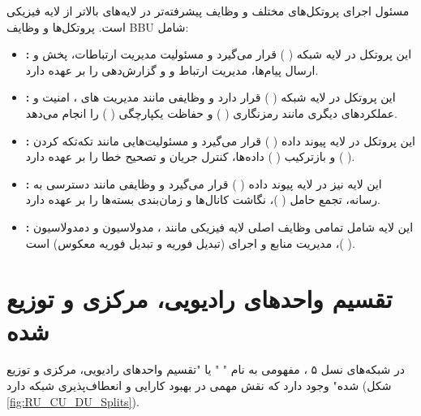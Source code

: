 \documentclass[landscape, 12pt]{report}
\begin{document}
     
        مسئول اجرای پروتکل‌های مختلف و وظایف پیشرفته‌تر در لایه‌های بالاتر از لایه فیزیکی است. پروتکل‌ها و وظایف BBU شامل:
\begin{itemize}
\item
\textbf{
:}
این پروتکل در لایه شبکه (
) قرار می‌گیرد و مسئولیت مدیریت ارتباطات، پخش و ارسال پیام‌ها، مدیریت ارتباط و 
 و گزارش‌دهی را بر عهده دارد.
\item
 \textbf{
 :}
 این پروتکل در لایه شبکه (
 ) قرار دارد و وظایفی مانند مدیریت
   های
     ، امنیت و عملکردهای دیگری مانند رمزنگاری (
     ) و حفاظت یکپارچگی (
     ) را انجام می‌دهد.
\item
\textbf{
:}
این پروتکل در لایه پیوند داده (
) قرار می‌گیرد و مسئولیت‌هایی مانند تکه‌تکه کردن (
) و بازترکیب  (
) داده‌ها، کنترل جریان و تصحیح خطا را بر عهده دارد.
\item
\textbf{
:}
 این لایه نیز در لایه پیوند داده (
 ) قرار می‌گیرد و وظایفی مانند دسترسی به رسانه، تجمع حامل (
 )، نگاشت کانال‌ها
   و زمان‌بندی بسته‌ها را بر عهده دارد.
\item
\textbf{
:}
این لایه شامل تمامی وظایف اصلی لایه فیزیکی مانند 
، مدولاسیون و دمدولاسیون (
 )، مدیریت منابع و اجرای
  (تبدیل فوریه و تبدیل فوریه معکوس) است.
\end{itemize}

      
\chapter*{تقسیم واحدهای رادیویی، مرکزی و توزیع شده}   
در شبکه‌های نسل ۵ ، مفهومی به نام "
" یا "تقسیم واحدهای رادیویی، مرکزی و توزیع شده" وجود دارد که نقش مهمی در بهبود کارایی و انعطاف‌پذیری شبکه دارد (شکل \ref{fig:RU_CU_DU_Splits}).
\end{document}
